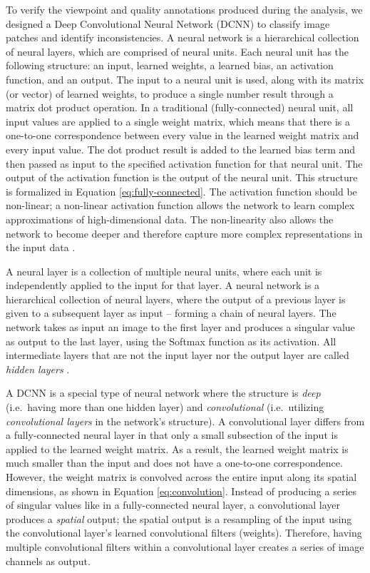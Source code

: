 To verify the viewpoint and quality annotations produced during the analysis, we designed a Deep Convolutional Neural Network (DCNN) to classify image patches and identify inconsistencies.  A neural network is a hierarchical collection of neural layers, which are comprised of neural units.  Each neural unit has the following structure: an input, learned weights, a learned bias, an activation function, and an output.  The input to a neural unit is used, along with its matrix (or vector) of learned weights, to produce a single number result through a matrix dot product operation.  In a traditional (fully-connected) neural unit, all input values are applied to a single weight matrix, which means that there is a one-to-one correspondence between every value in the learned weight matrix and every input value.  The dot product result is added to the learned bias term and then passed as input to the specified activation function for that neural unit.  The output of the activation function is the output of the neural unit.  This structure is formalized in Equation \ref{eq:fully-connected}.  The activation function should be non-linear; a non-linear activation function allows the network to learn complex approximations of high-dimensional data.  The non-linearity also allows the network to  become deeper and therefore capture more complex representations in the input data \cite{glorot_deep_2011, hecht-nielsen_theory_1989, krizhevsky_imagenet_2012}.

A neural layer is a collection of multiple neural units, where each unit is independently applied to the input for that layer.  A neural network is a hierarchical collection of neural layers, where the output of a previous layer is given to a subsequent layer as input -- forming a chain of neural layers.  The network takes as input an image to the first layer and produces a singular value as output to the last layer, using the Softmax function as its activation.  All intermediate layers that are not the input layer nor the output layer are called \textit{hidden layers} \cite{funahashi_approximate_1989}.

A DCNN is a special type of neural network where the structure is \textit{deep} (i.e.\ having more than one hidden layer) and \textit{convolutional} (i.e.\ utilizing \textit{convolutional layers} in the network's structure).  A convolutional layer differs from a fully-connected neural layer in that only a small subsection of the input is applied to the learned weight matrix.  As a result, the learned weight matrix is much smaller than the input and does not have a one-to-one correspondence.  However,  the weight matrix is convolved across the entire input along its spatial dimensions, as shown in Equation \ref{eq:convolution}.  Instead of producing a series of singular values like in a fully-connected neural layer, a convolutional layer produces a \textit{spatial} output; the spatial output is a resampling of the input using the convolutional layer's learned convolutional filters (weights).  Therefore, having multiple convolutional filters within a convolutional layer creates a series of image channels as output.

